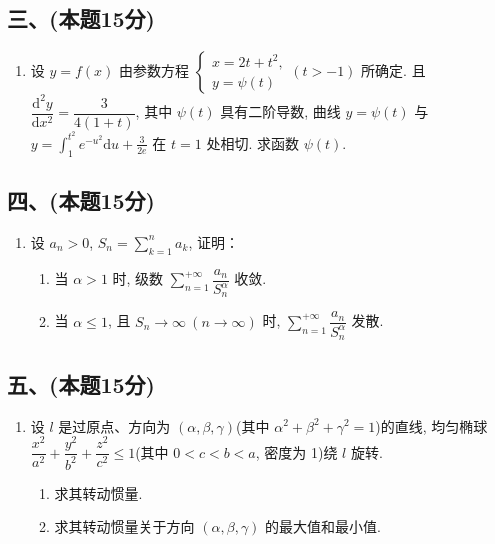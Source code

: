 \subsection*{三、(本题15分)}

\begin{enumerate}[start=7]
    \item 设 $y = f(x)$ 由参数方程
          $\begin{cases}
                  x = 2t + t^2 , \\
                  y = \psi(t)
              \end{cases}  (t > -1)$
          所确定. 且 $\dfrac{\mathrm{d}^2 y}{\mathrm{d}x^2} = \dfrac{3}{4(1 + t)}$,  其中 $\psi(t)$ 具有二阶导数,  曲线 $y = \psi(t)$ 与 $y = \displaystyle\int_1^{t^2} e^{-u^2}  \mathrm{d}u + \frac{3}{2e}$ 在 $t = 1$ 处相切. 求函数 $\psi(t)$.
\end{enumerate}

\subsection*{四、(本题15分)}

\begin{enumerate}[start=8]
    \item 设 $a_n > 0$,  $S_n = \displaystyle\sum_{k = 1}^n a_k$,  证明：
          \begin{enumerate}
              \item [(1)] 当 $\alpha > 1$ 时,  级数 $\displaystyle\sum_{n = 1}^{+\infty} \dfrac{a_n}{S_n^\alpha}$ 收敛.
              \item [(2)] 当 $\alpha \leq 1$,  且 $S_n \to \infty \ (n \to \infty)$ 时,  $\displaystyle\sum_{n = 1}^{+\infty} \dfrac{a_n}{S_n^\alpha}$ 发散.
          \end{enumerate}
\end{enumerate}

\subsection*{五、(本题15分)}

\begin{enumerate}[start=9]
    \item 设 $l$ 是过原点、方向为 $(\alpha,  \beta,  \gamma)$(其中 $\alpha^2 + \beta^2 + \gamma^2 = 1$)的直线,  均匀椭球 $\dfrac{x^2}{a^2} + \dfrac{y^2}{b^2} + \dfrac{z^2}{c^2} \leq 1$(其中 $0 < c < b < a$,  密度为 1)绕 $l$ 旋转.
          \begin{enumerate}
              \item [(1)] 求其转动惯量.
              \item [(2)] 求其转动惯量关于方向 $(\alpha,  \beta,  \gamma)$ 的最大值和最小值.
          \end{enumerate}
\end{enumerate}

